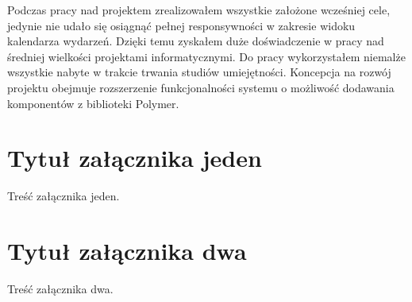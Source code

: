\documentclass[openright]{xmgr}
\begin{document}
\summary
Podczas pracy nad projektem zrealizowałem wszystkie założone wcześniej cele, jedynie nie udało się osiągnąć pełnej responsywności w zakresie widoku kalendarza wydarzeń. Dzięki temu zyskałem duże doświadczenie w pracy nad średniej wielkości projektami informatycznymi. Do pracy wykorzystałem niemalże wszystkie nabyte w trakcie trwania studiów umiejętności. Koncepcja na rozwój projektu obejmuje rozszerzenie funkcjonalności systemu o możliwość dodawania komponentów z biblioteki Polymer. 

\appendix
\chapter{Tytuł załącznika jeden}

Treść załącznika jeden.

\chapter{Tytuł załącznika dwa}

Treść załącznika dwa.

\listoffigures

\lstlistoflistings
{}%

\oswiadczenie
\end{document}
